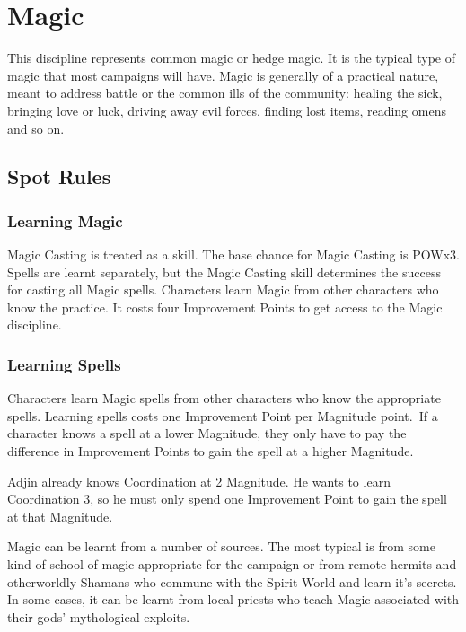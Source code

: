 \chapter{Magic}
\label{ch:magic}

This discipline represents common magic or hedge magic. It is the typical type of magic that most campaigns will have. Magic is generally of a practical nature, meant to address battle or the common ills of the community: healing the sick, bringing love or luck, driving away evil forces, finding lost items, reading omens and so on. 


\section{Spot Rules}

\subsection{Learning Magic}
Magic Casting is treated as a skill. The base chance for Magic Casting is POWx3. Spells are learnt separately, but the Magic Casting skill determines the success for casting all Magic spells. Characters learn Magic from other characters who know the practice. It costs four Improvement Points to get access to the Magic discipline.

\subsection{Learning Spells}
Characters learn Magic spells from other characters who know the appropriate spells. Learning spells costs one Improvement Point per Magnitude point. If a character knows a spell at a lower Magnitude, they only have to pay the difference in Improvement Points to gain the spell at a higher Magnitude.

\begin{rpg-examplebox}
Adjin already knows Coordination at 2 Magnitude. He wants to learn Coordination 3, so he must only spend one Improvement Point to gain the spell at that Magnitude.
\end{rpg-examplebox}


Magic can be learnt from a number of sources. The most typical is from some kind of school of magic appropriate for the campaign or from remote hermits and otherworldly Shamans who commune with the Spirit World and learn it's secrets. In some cases, it can be learnt from local priests who teach Magic associated with their gods’ mythological exploits.

